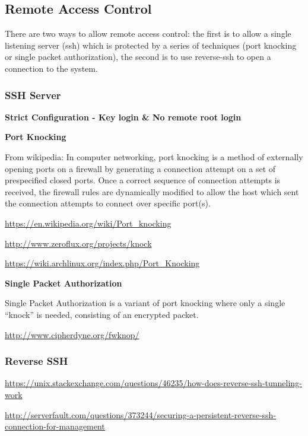 \subsection{Remote Access Control}

There are two ways to allow remote access control: the first is to allow a single listening server (ssh) which is protected by a series of techniques (port knocking or single packet authorization), the second is to use reverse-ssh to open a connection to the system.

\subsubsection{SSH Server}

\noindent
\textbf{Strict Configuration - Key login \& No remote root login \\}



\noindent
\textbf{Port Knocking}

From wikipedia: In computer networking, port knocking is a method of externally opening ports on a firewall by generating a connection attempt on a set of prespecified closed ports. Once a correct sequence of connection attempts is received, the firewall rules are dynamically modified to allow the host which sent the connection attempts to connect over specific port(s). 

\url{https://en.wikipedia.org/wiki/Port_knocking}

\url{http://www.zeroflux.org/projects/knock}

\url{https://wiki.archlinux.org/index.php/Port_Knocking}

\noindent
\textbf{Single Packet Authorization}

Single Packet Authorization is a variant of port knocking where only a single ``knock'' is needed, consisting of an encrypted packet.

\url{http://www.cipherdyne.org/fwknop/}

\subsubsection{Reverse SSH}

\url{https://unix.stackexchange.com/questions/46235/how-does-reverse-ssh-tunneling-work}

\url{http://serverfault.com/questions/373244/securing-a-persistent-reverse-ssh-connection-for-management}

